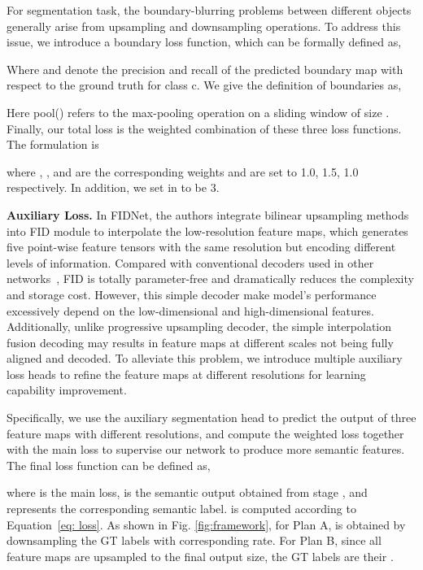 \documentclass{article}
\begin{document}
For segmentation task, the boundary-blurring problems between different objects generally arise from upsampling and downsampling operations. To address this issue, we introduce a boundary loss function, which can be formally defined as, 

\vspace{-1ex}

Where  and  denote the precision and recall of the predicted boundary map  with respect to the ground truth  for class c. We give the definition of boundaries as,
\vspace{-1ex}

Here pool() refers to the max-pooling operation on a sliding window of size . Finally, our total loss is the weighted combination of these three loss functions. The formulation is 
\vspace{-1ex}

where , , and  are the corresponding weights and are set to 1.0, 1.5, 1.0 respectively. In addition, we set  in  to be 3.

\noindent\textbf{Auxiliary Loss.} In FIDNet, the authors integrate bilinear upsampling methods into FID module to interpolate the low-resolution feature maps, which generates five point-wise feature tensors with the same resolution but encoding different levels of information.  Compared with conventional decoders used in other networks~\cite{cortinhal2020salsanext,Lite-HDSeg, kochanov2020kprnet}, FID is totally parameter-free and dramatically reduces the complexity and storage cost. However, this simple decoder make model's performance excessively depend on the low-dimensional and high-dimensional features. Additionally, unlike progressive upsampling decoder, the simple interpolation fusion decoding may results in feature maps at different scales not being fully aligned and decoded. To alleviate this problem, we introduce multiple auxiliary loss heads to refine the feature maps at different resolutions for learning capability improvement.

Specifically, we use the auxiliary segmentation head to predict the output of three feature maps with different resolutions, and compute the weighted loss together with the main loss to supervise our network to produce more semantic features. The final loss function can be defined as,
\vspace{-1ex}

where  is the main loss,  is the semantic output obtained from stage , and  represents the corresponding semantic label.  is computed according to Equation~\ref{eq: loss}. As shown in Fig. \ref{fig:framework}, for Plan A,   is obtained by downsampling the GT labels with corresponding rate. For Plan B, since all feature maps are upsampled to the final output size, the GT labels are their .
\end{document}
